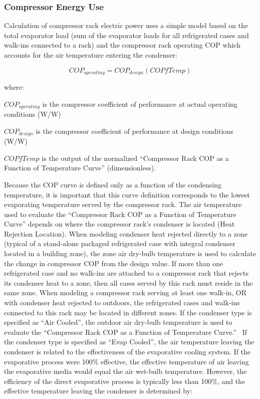 \subsubsection{Compressor Energy Use}\label{compressor-energy-use}

Calculation of compressor rack electric power uses a simple model based on the total evaporator load (sum of the evaporator loads for all refrigerated cases and walk-ins connected to a rack) and the compressor rack operating COP which accounts for the air temperature entering the condenser:

\begin{equation}
CO{P_{operating}} = CO{P_{design}}\left( {COPfTemp} \right)
\end{equation}

where:

\(CO{P_{operating}}\) is the compressor coefficient of performance at actual operating conditions (W/W)

\(CO{P_{design}}\) is the compressor coefficient of performance at design conditions (W/W)

\(COPfTemp\) is the output of the normalized ``Compressor Rack COP as a Function of Temperature Curve'' (dimensionless).

Because the COP curve is defined only as a function of the condensing temperature, it is important that this curve definition corresponds to the lowest evaporating temperature served by the compressor rack. The air temperature used to evaluate the ``Compressor Rack COP as a Function of Temperature Curve'' depends on where the compressor rack's condenser is located (Heat Rejection Location). When modeling condenser heat rejected directly to a zone (typical of a stand-alone packaged refrigerated case with integral condenser located in a building zone), the zone air dry-bulb temperature is used to calculate the change in compressor COP from the design value. If more than one refrigerated case and no walk-ins are attached to a compressor rack that rejects its condenser heat to a zone, then all cases served by this rack must reside in the same zone. When modeling a compressor rack serving at least one walk-in, OR with condenser heat rejected to outdoors, the refrigerated cases and walk-ins connected to this rack may be located in different zones. If the condenser type is specified as ``Air Cooled'', the outdoor air dry-bulb temperature is used to evaluate the ``Compressor Rack COP as a Function of Temperature Curve.''~ If the condenser type is specified as ``Evap Cooled'', the air temperature leaving the condenser is related to the effectiveness of the evaporative cooling system. If the evaporative process were 100\% effective, the effective temperature of air leaving the evaporative media would equal the air wet-bulb temperature. However, the efficiency of the direct evaporative process is typically less than 100\%, and the effective temperature leaving the condenser is determined by:


